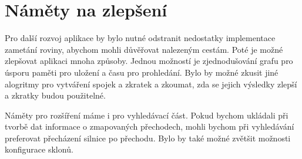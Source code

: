 \section{Náměty na zlepšení}
Pro další rozvoj aplikace by bylo nutné odstranit nedostatky implementace
zametání roviny, abychom mohli důvěřovat nalezeným cestám. Poté je možné
zlepšovat aplikaci mnoha způsoby. Jednou možností je zjednodušování grafu pro
úsporu paměti pro uložení a času pro prohledání. Bylo by možné zkusit jiné
alogritmy pro vytváření spojek a zkratek a zkoumat, zda se jejich výsledky
zlepší a zkratky budou použitelné.  

Náměty pro rozšíření máme i pro vyhledávací část. Pokud bychom ukládali při
tvorbě dat informace o zmapovaných přechodech, mohli bychom při vyhledávání
preferovat přecházení silnice po přechodu. Bylo by také možné zvětšit možnosti
konfigurace sklonů. 

